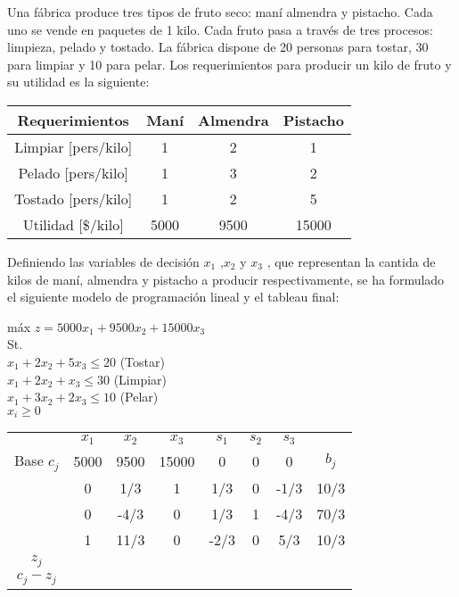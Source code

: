 Una fábrica produce tres tipos de fruto seco: maní almendra y pistacho. Cada uno se vende en paquetes de 1 kilo. Cada fruto pasa a trav\'es de tres procesos: limpieza, pelado y tostado. La fábrica dispone de 20 personas para tostar, 30 para limpiar y 10 para pelar. Los requerimientos para producir un kilo de fruto y su utilidad es la siguiente:

\begin{center}

\begin{tabular}{ c | c | c | c }
Requerimientos	& Man\'i & Almendra & Pistacho\\
\hline
Limpiar [pers/kilo]	& 1	  & 2   & 1\\
Pelado [pers/kilo]	& 1	  & 3   & 2\\
Tostado [pers/kilo]	& 1	  & 2   & 5\\
Utilidad [\$/kilo]	& 5000	  & 9500   & 15000\\
\end{tabular}

\end{center}

Definiendo las variables de decisi\'on $x_1$ ,$x_2$ y $x_3$ , que representan la cantida de kilos de maní, almendra y pistacho a producir respectivamente, se ha formulado el siguiente modelo de programación lineal y el tableau final:

máx $z = 5000x_1 + 9500x_2 + 15000x_3$\\
St.\\
$x_1 + 2x_2 + 5x_3 \leq 20$ (Tostar)\\
$x_1 + 2x_2 + x_3 \leq 30$ (Limpiar)\\
$x_1 + 3x_2 + 2x_3 \leq 10$ (Pelar)\\
$x_i \geq 0$

\begin{center}

\begin{tabular}{ c | c | c | c | c | c | c | c }
			& $x_1$ & $x_2$ & $x_3$ & $s_1$ & $s_2$ & $s_3$ &\\
Base $c_j$	& 5000	& 9500	& 15000	&   0	& 0 		&   0	& $b_j$\\
\hline
			& 0  & 1/3 & 1 & 1/3 & 0 & -1/3 & 10/3\\
			& 0  & -4/3 & 0 & 1/3 & 1 & -4/3 & 70/3\\
			& 1  & 11/3 & 0 & -2/3 & 0 & 5/3 & 10/3\\
\hline
$z_j$		&   &   &  & & & &\\
$c_j - z_j$	&   &   &  & & & &\\
\end{tabular}

\end{center}

